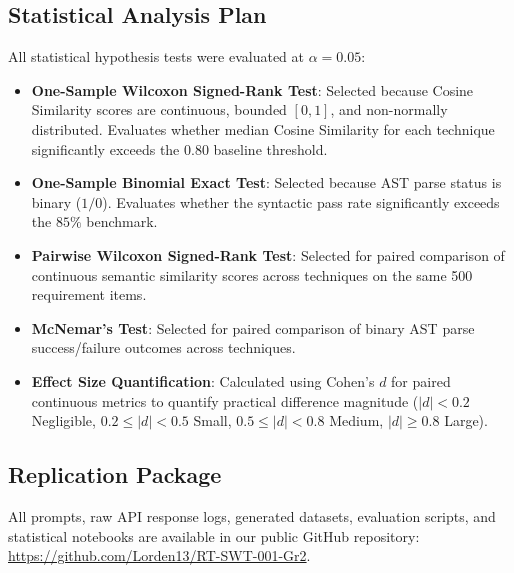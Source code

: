 \subsection{Statistical Analysis Plan}
All statistical hypothesis tests were evaluated at $\alpha = 0.05$:
\begin{itemize}
    \item \textbf{One-Sample Wilcoxon Signed-Rank Test}: Selected because Cosine Similarity scores are continuous, bounded $[0, 1]$, and non-normally distributed. Evaluates whether median Cosine Similarity for each technique significantly exceeds the $0.80$ baseline threshold.
    \item \textbf{One-Sample Binomial Exact Test}: Selected because AST parse status is binary ($1/0$). Evaluates whether the syntactic pass rate significantly exceeds the $85\%$ benchmark.
    \item \textbf{Pairwise Wilcoxon Signed-Rank Test}: Selected for paired comparison of continuous semantic similarity scores across techniques on the same 500 requirement items.
    \item \textbf{McNemar's Test}: Selected for paired comparison of binary AST parse success/failure outcomes across techniques.
    \item \textbf{Effect Size Quantification}: Calculated using Cohen's $d$ for paired continuous metrics to quantify practical difference magnitude ($|d| < 0.2$ Negligible, $0.2 \le |d| < 0.5$ Small, $0.5 \le |d| < 0.8$ Medium, $|d| \ge 0.8$ Large).
\end{itemize}

\subsection{Replication Package}
All prompts, raw API response logs, generated datasets, evaluation scripts, and statistical notebooks are available in our public GitHub repository: \url{https://github.com/Lorden13/RT-SWT-001-Gr2}.

